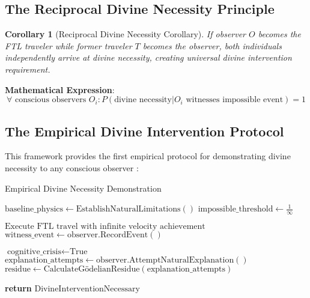 \documentclass[12pt,a4paper]{article}
\newtheorem{corollary}[theorem]{Corollary}
\begin{document}
\subsection{The Reciprocal Divine Necessity Principle}

\begin{corollary}[Reciprocal Divine Necessity Corollary]
If observer $O$ becomes the FTL traveler while former traveler $T$ becomes the observer, both individuals independently arrive at divine necessity, creating universal divine intervention requirement.
\end{corollary}

\textbf{Mathematical Expression}:
$$\forall \text{ conscious observers } O_i: P(\text{divine necessity}|O_i \text{ witnesses impossible event}) = 1$$

\subsection{The Empirical Divine Intervention Protocol}

This framework provides the first empirical protocol for demonstrating divine necessity to any conscious observer \citep{sachikonye2024empirical}:

\begin{algorithm}
\caption{Empirical Divine Necessity Demonstration}
\begin{algorithmic}[1]
    \State $\text{baseline\_physics} \leftarrow \text{EstablishNaturalLimitations}()$
    \State $\text{impossible\_threshold} \leftarrow \frac{1}{\infty}$
    
    \State $\text{Execute FTL travel with infinite velocity achievement}$
    \State $\text{witness\_event} \leftarrow \text{observer.RecordEvent}()$
    
        \State $\text{cognitive\_crisis} \leftarrow \text{True}$
        \State $\text{explanation\_attempts} \leftarrow \text{observer.AttemptNaturalExplanation}()$
        \State $\text{residue} \leftarrow \text{CalculateGödelianResidue}(\text{explanation\_attempts})$
        
            \State \textbf{return} $\text{DivineInterventionNecessary}$
        \EndIf
    \EndIf
\EndProcedure
\end{algorithmic}
\end{algorithm}
\end{document}

